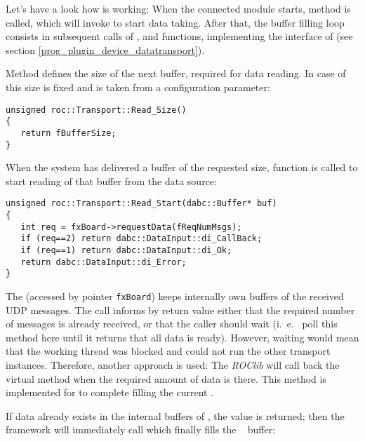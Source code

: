 Let's have a look how  is working:
When the connected module starts, method  is called,
which will invoke  to start data taking. 
After that, the buffer filling loop consists in subsequent calls of ,  and 
functions, implementing the interface of  
(see section \ref{prog_plugin_device_datatransport}). 

Method  defines the size of the next buffer, 
required for data reading. In case of  this size
is fixed and is taken from a configuration parameter:  

\begin{verbatim}
unsigned roc::Transport::Read_Size()
{
   return fBufferSize;
}
\end{verbatim}
    
When the system has delivered a buffer of the requested size,  
function  is called to start reading 
of that buffer from the data source:

\begin{verbatim}
unsigned roc::Transport::Read_Start(dabc::Buffer* buf)
{
   int req = fxBoard->requestData(fReqNumMsgs);
   if (req==2) return dabc::DataInput::di_CallBack;
   if (req==1) return dabc::DataInput::di_Ok;
   return dabc::DataInput::di_Error;
}
\end{verbatim}

The  (accessed by pointer {\tt fxBoard})
keeps internally  own buffers of the received UDP messages.
The call  informs by return value
either that the required number of messages is already received,
or that the caller should wait (i.~e.~ poll this method here until
it returns that all data is ready). 
However, waiting would mean that the working thread was blocked and 
could not run the other transport instances. Therefore, another approach is used: 
The {\em ROClib} will call back the virtual method   
when the required amount of data is there. This method
is implemented for  to complete filling the current
.

If data already exists in the internal buffers of ,
the value  
is returned; then the  framework will immediately call  which finally fills the \dabc~ buffer:

